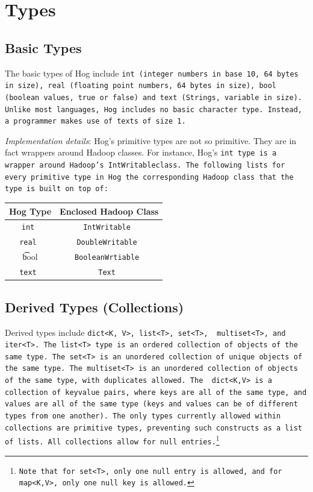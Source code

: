 \documentclass{article}
\begin{document}


\section{Types} %
\label{sec:types}

\subsection{Basic Types} %
\label{sub:basic_types}

The basic types of Hog include \tt int \rm (integer numbers in base 10, 64 bytes
in size), \tt real \rm (floating point numbers, 64 bytes in size), \tt bool
\rm(boolean values, true or false) and \tt text \rm (Strings, variable in size).
Unlike most languages, Hog includes no basic character type. Instead, a programmer
makes use of \tt text\rm s of size 1.

\emph{Implementation details}: Hog’s primitive types are not so primitive. They are
in fact wrappers around Hadoop classes. For instance, Hog’s \tt int \rm type is a
wrapper around Hadoop's \tt IntWritableclass\rm. The following lists for every
primitive type in Hog the corresponding Hadoop class that the type is built on top
of:

\begin{center}
\begin{tabular}{|c|c|}
    \hline
\textbf{Hog Type} & \textbf{Enclosed Hadoop Class} \\ \hline
\tt int & \tt IntWritable \\ \hline
\tt real & \tt DoubleWritable \\ \hline
\t bool & \tt BooleanWrtiable \\ \hline
\tt text & \tt Text \rm \\ \hline
\end{tabular}
\end{center}


\subsection{Derived Types (Collections)} %
\label{sub:derived_types_collections_}

Derived types include \tt dict<K, V>\rm, \tt list<T>\rm, \tt set<T>\rm, \tt
multiset<T>\rm, and \tt iter<T>\rm. The \tt list<T> \rm type is an ordered
collection of objects of the same type. The \tt set<T> \rm is an unordered
collection of unique objects of the same type. The \tt multiset<T> \rm is an
unordered collection of objects of the same type, with duplicates allowed. The \tt
dict<K,V> \rm is a collection of key­value pairs, where keys are all of the same
type, and values are all of the same type (keys and values can be of different
types from one another). The only types currently allowed within collections are
primitive types, preventing such constructs as a list of lists. All collections
allow for null entries.\footnote{Note that for \tt set<T>\rm, only one \tt null
\rm entry is allowed, and for \tt map<K,V>\rm, only one \tt null \rm key is
allowed.}
\end{document}
